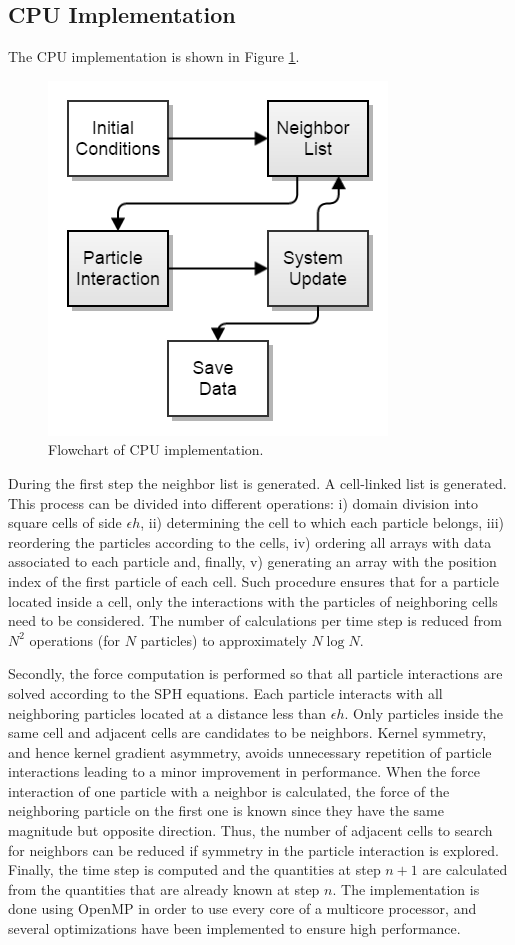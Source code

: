 \subsection{\ac{CPU} Implementation}
%
The \ac{CPU} implementation is shown in Figure \ref{fig:CPU_GPU}. 
%
\begin{figure}[ht!]
	\centering
	\includegraphics[width=0.35\linewidth]{Figures/4.Chapter/CPU_diagram.png}
	\caption{\small{Flowchart of \ac{CPU} implementation.}}
	\label{fig:CPU_GPU} 
\end{figure}
%

During the first step the neighbor list is generated. A cell-linked list \citep{Dominguez-2011} is generated. This process can be divided into different operations: i) domain division into square cells of side $\epsilon h$, ii) determining the cell to which each particle belongs, iii) reordering the particles according to the cells, iv) ordering all arrays with data associated to each particle and, finally, v) generating an array with the position index of the first particle of each cell. Such procedure ensures that for a particle located inside a cell, only the interactions with the particles of neighboring cells need to be considered. The number of calculations per time step is reduced from $N^2$ operations (for $N$ particles) to approximately $N\log{N}$.

Secondly, the force computation is performed so that all particle interactions are solved according to the \ac{SPH} equations. Each particle interacts with all neighboring particles located at a distance less than $\epsilon h$. Only particles inside the same cell and adjacent cells are candidates to be neighbors. Kernel symmetry, and hence kernel gradient asymmetry, avoids unnecessary repetition of particle interactions leading to a minor improvement in performance. When the force interaction of one particle with a neighbor is calculated, the force of the neighboring particle on the first one is known since they have the same magnitude but opposite direction. Thus, the number of adjacent cells to search for neighbors can be reduced if symmetry in the particle interaction is explored. Finally, the time step is computed and the quantities at step $n+1$ are calculated from the quantities that are already known at step $n$. The implementation is done using OpenMP in order to use every core of a multicore processor, and several optimizations have been implemented to ensure high performance. 

